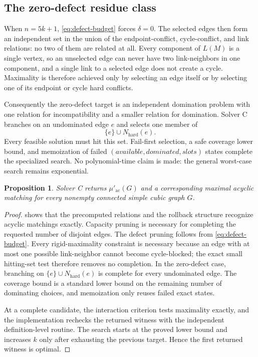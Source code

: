 \documentclass[smallextended,natbib,nospthms]{svjour3}
\newtheorem{proposition}[proposition]{Proposition}
\theoremstyle{definition}
\theoremstyle{remark}
\newcommand{\acnum}{\mu'_{\mathrm{ac}}}
\begin{document}
\subsection{The zero-defect residue class}

When $n=5k+1$, \eqref{eq:defect-budget} forces $\delta=0$. The selected edges
then form an independent set in the union of the endpoint-conflict,
cycle-conflict, and link relations: no two of them are related at all. Every
component of $L(M)$ is a single vertex, so an unselected edge can never have
two link-neighbors in one component, and a single link to a selected edge does
not create a cycle. Maximality is therefore achieved only by selecting an edge
itself or by selecting one of its endpoint or cycle hard conflicts.

Consequently the zero-defect target is an independent domination problem with
one relation for incompatibility and a smaller relation for domination.
Solver C branches on an undominated edge $e$ and selects one member of
\[
  \{e\}\cup N_{\mathrm{hard}}(e).
\]
Every feasible solution must hit this set. Fail-first selection, a safe
coverage lower bound, and memoization of failed
$(\textit{available},\textit{dominated},\textit{slots})$ states complete the
specialized search. No polynomial-time claim is made: the general worst-case
search remains exponential.

\begin{proposition}
\label{prop:solver-c-correct}
Solver C returns $\acnum(G)$ and a corresponding maximal acyclic matching for
every nonempty connected simple cubic graph $G$.
\end{proposition}

\begin{proof}
 shows that the precomputed relations and the
rollback structure recognize acyclic matchings exactly. Capacity pruning is
necessary for completing the requested number of disjoint edges. The defect
pruning follows from \eqref{eq:defect-budget}. Every rigid-maximality
constraint is necessary because an edge with at most one possible
link-neighbor cannot become cycle-blocked; the exact small hitting-set test
therefore removes no completion. In the zero-defect case, branching on
$\{e\}\cup N_{\mathrm{hard}}(e)$ is complete for every undominated edge.
The coverage bound is a standard lower bound on the remaining number of
dominating choices, and memoization only reuses failed exact states.

At a complete candidate, the interaction criterion tests maximality exactly,
and the implementation rechecks the returned witness with the independent
definition-level routine. The search starts at the proved lower bound and
increases $k$ only after exhausting the previous target. Hence the first
returned witness is optimal.
\end{proof}
\end{document}
